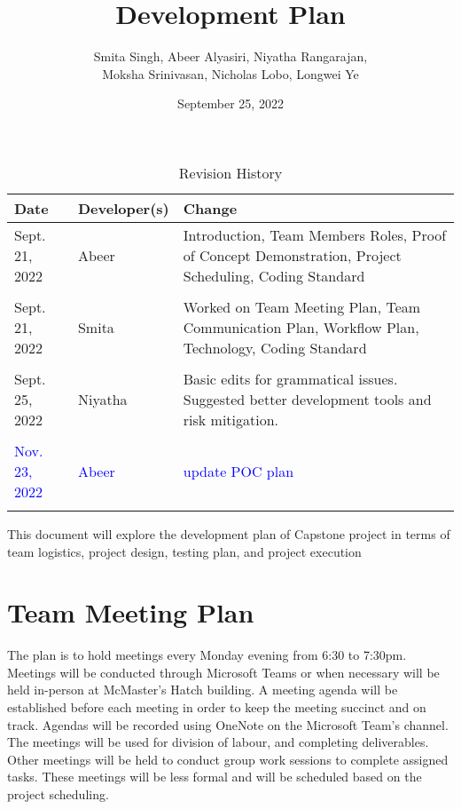 \documentclass{article}
\title{Development Plan\\\prognam}
\author{Smita Singh, Abeer Alyasiri, Niyatha Rangarajan,\\ Moksha Srinivasan, Nicholas Lobo, Longwei Ye}
\date{September 25, 2022}
\begin{document}
\maketitle

\begin{table}[hp]
\caption{Revision History} \label{TblRevisionHistory}
\begin{tabularx}{\textwidth}{llX}
\toprule
\textbf{Date} & \textbf{Developer(s)} & \textbf{Change}\\
\midrule
Sept. 21, 2022 & Abeer & Introduction, Team Members Roles, Proof of Concept Demonstration, Project Scheduling, Coding Standard \\\\
Sept. 21, 2022 & Smita & Worked on Team Meeting Plan, Team Communication Plan, Workflow Plan, Technology, Coding Standard\\\\
Sept. 25, 2022 & Niyatha & Basic edits for grammatical issues. Suggested better 
 development tools and risk mitigation.\\\\
\textcolor{blue}{Nov. 23, 2022} & \textcolor{blue}{Abeer} & \textcolor{blue}{update POC plan} \\\\
\bottomrule
\end{tabularx}
\end{table}

\newpage

\maketitle

This document will explore the development plan of Capstone project in terms of team logistics, project design, testing plan, and project execution %

\section{Team Meeting Plan}
The plan is to hold meetings every Monday evening from 6:30 to 7:30pm. Meetings will be conducted through Microsoft Teams or when necessary will be held in-person at McMaster's Hatch building. A meeting agenda will be established before each meeting in order to keep the meeting succinct and on track. Agendas will be recorded using OneNote on the Microsoft Team's channel. The meetings will be used for division of labour, and completing deliverables. %
Other meetings will be held to conduct group work sessions to complete assigned tasks. These meetings will be less formal and will be scheduled based on the project scheduling.
\end{document}
